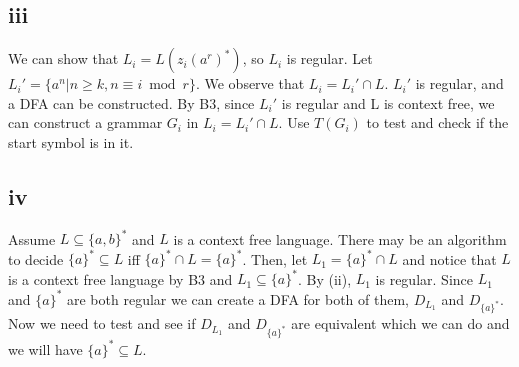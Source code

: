 \documentclass[12pt]{article}
\begin{document}
\subsection*{iii}

We can show that $L_i=L(z_i(a^r)^*)$, so $L_i$ is regular. Let $L_i'=\{a^n|n \ge k, n \equiv i \bmod r\}$. We observe that $L_i=L_i' \cap L$.  $L_i'$ is regular, and a DFA can be constructed. By B3, since $L_i'$ is regular and L is context free, we can construct a grammar $G_i$ in $L_i=L_i' \cap L$. Use $T(G_i)$ to test and check if the start symbol is in it. 

\subsection*{iv}
Assume $L \subseteq \{a,b\}^*$ and $L$ is a context free language.  There may be an algorithm to decide $\{a\}^* \subseteq L$ iff $\{a\}^* \cap L=\{a\}^*$. Then, let $L_1=\{a\}^* \cap L$ and notice that $L$ is a context free language by B3 and $L_1 \subseteq \{a\}^*$. By (ii), $L_1$ is regular. Since $L_1$ and $\{a\}^*$ are both regular we can create a DFA for both of them, $D_{L_1}$ and $D_{\{a\}^*}$. Now we need to test and see if $D_{L_1}$ and $D_{\{a\}^*}$ are equivalent which we can do and we will have $\{a\}^* \subseteq L$.  
\end{document}
